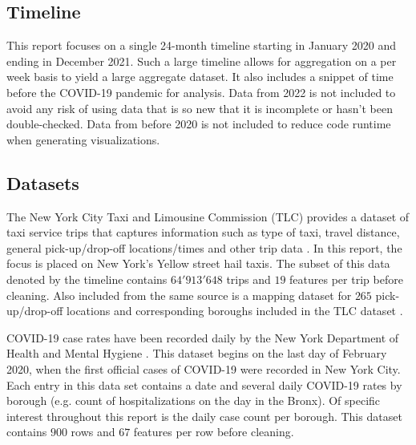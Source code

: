 \documentclass[11pt]{article}
\begin{document}
\subsection{Timeline}
This report focuses on a single 24-month timeline starting in January 2020 and ending in December 2021.
Such a large timeline allows for aggregation on a per week basis to yield a large aggregate dataset.
It also includes a snippet of time before the COVID-19 pandemic for analysis.
Data from 2022 is not included to avoid any risk of using data that is so new that it is incomplete or hasn't been double-checked.
Data from before 2020 is not included to reduce code runtime when generating visualizations.
\subsection{Datasets}
The New York City Taxi and Limousine Commission (TLC) provides a dataset of taxi service trips that captures information such as type of taxi, travel distance, general pick-up/drop-off locations/times and other trip data \cite{tlcdataset}. 
In this report, the focus is placed on New York's Yellow street hail taxis.
The subset of this data denoted by the timeline contains $64'913'648$ trips and $19$ features per trip before cleaning.
Also included from the same source is a mapping dataset for $265$ pick-up/drop-off locations and corresponding boroughs included in the TLC dataset \cite{tlcdataset}.

COVID-19 case rates have been recorded daily by the New York Department of Health and Mental Hygiene \cite{coviddataset}.
This dataset begins on the last day of February 2020, when the first official cases of COVID-19 were recorded in New York City. 
Each entry in this data set contains a date and several daily COVID-19 rates by borough (e.g. count of hospitalizations on the day in the Bronx).
Of specific interest throughout this report is the daily case count per borough.
This dataset contains $900$ rows and $67$ features per row before cleaning.
\end{document}
